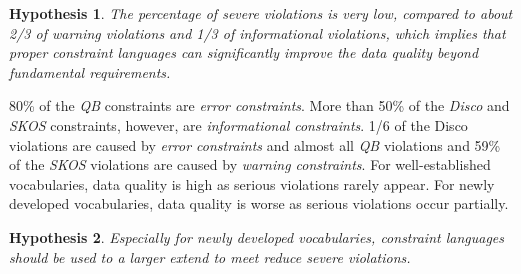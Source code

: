 \documentclass{llncs}
\newtheorem{hyp}{Hypothesis}
\begin{document}
\begin{hyp}
The percentage of severe violations is very low, compared to about 2/3 of warning violations and 1/3 of informational violations, which implies that proper constraint languages can significantly improve the data quality beyond fundamental requirements.
\end{hyp} 

80\% of the \emph{QB} constraints are \emph{error constraints}.
More than 50\% of the \emph{Disco} and \emph{SKOS} constraints, however, are \emph{informational constraints}.
1/6 of the Disco violations are caused by \emph{error constraints} and
almost all \emph{QB} violations and 59\% of the \emph{SKOS} violations are caused by \emph{warning constraints}.  
For well-established vocabularies, data quality is high
as serious violations rarely appear.
For newly developed vocabularies, data quality is worse
as serious violations occur partially.
\begin{hyp}
Especially for newly developed vocabularies, constraint languages should be used to a larger extend to meet reduce severe violations.   
\end{hyp} 

\end{document}
